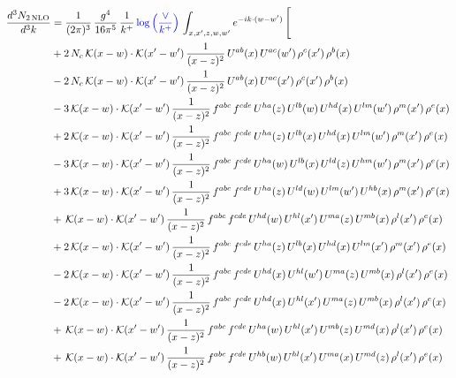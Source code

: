 \documentclass[9pt]{article}
\numberwithin{equation}{section}
\begin{document}
\begin{align}
\frac{d^{3}N_{2\,\mathrm{NLO}}}{d^{3}k} & = \frac{1}{(2\pi)^{3}}\,\frac{g^{4}}{16\pi^{5}}\,\frac{1}{k^{+}}\,{\color{blue}\log{\left(\frac{\vee}{k^{+}}\right)}}\,\int_{x,x',z,w,w'}e^{-ik\cdot (w-w')}\,\Bigg[
\notag\\ &+2\,N_{c}\,\mathcal{K}(x-w)\cdot\mathcal{K}(x'-w')\,\frac{1}{(x-z)^{2}}\,U^{ab}(x)\,U^{ac}(w')\,\rho^{c}(x')\,\rho^{b}(x)\notag\\
&-2\,N_{c}\,\mathcal{K}(x-w)\cdot\mathcal{K}(x'-w')\,\frac{1}{(x-z)^{2}}\,U^{ab}(x)\,U^{ac}(x')\,\rho^{c}(x')\,\rho^{b}(x)\notag\\
&-3\,\mathcal{K}(x-w)\cdot\mathcal{K}(x'-w')\,\frac{1}{(x-z)^{2}}\,f^{abc}\,f^{cde}\,U^{ha}(z)\,U^{lb}(w)\,U^{hd}(x)\,U^{lm}(w')\,\rho^{m}(x')\,\rho^{e}(x)\notag\\
&+2\,\mathcal{K}(x-w)\cdot\mathcal{K}(x'-w')\,\frac{1}{(x-z)^{2}}\,f^{abc}\,f^{cde}\,U^{ha}(z)\,U^{lb}(x)\,U^{hd}(x)\,U^{lm}(w')\,\rho^{m}(x')\,\rho^{e}(x)\notag\\
&-3\,\mathcal{K}(x-w)\cdot\mathcal{K}(x'-w')\,\frac{1}{(x-z)^{2}}\,f^{abc}\,f^{cde}\,U^{ha}(w)\,U^{lb}(x)\,U^{ld}(z)\,U^{hm}(w')\,\rho^{m}(x')\,\rho^{e}(x)\notag\\
&+3\,\mathcal{K}(x-w)\cdot\mathcal{K}(x'-w')\,\frac{1}{(x-z)^{2}}\,f^{abc}\,f^{cde}\,U^{ha}(z)\,U^{ld}(w)\,U^{lm}(w')\,U^{hb}(x)\,\rho^{m}(x')\,\rho^{e}(x)\notag\\
&+\,\mathcal{K}(x-w)\cdot\mathcal{K}(x'-w')\,\frac{1}{(x-z)^{2}}\,f^{abc}\,f^{cde}\,U^{hd}(w)\,U^{hl}(x')\,U^{ma}(z)\,U^{mb}(x)\,\rho^{l}(x')\,\rho^{e}(x)\notag\\
&+2\,\mathcal{K}(x-w)\cdot\mathcal{K}(x'-w')\,\frac{1}{(x-z)^{2}}\,f^{abc}\,f^{cde}\,U^{ha}(z)\,U^{lb}(x)\,U^{hd}(x)\,U^{lm}(x')\,\rho^{m}(x')\,\rho^{e}(x)\notag\\
&-2\,\mathcal{K}(x-w)\cdot\mathcal{K}(x'-w')\,\frac{1}{(x-z)^{2}}\,f^{abc}\,f^{cde}\,U^{hd}(x)\,U^{hl}(w')\,U^{ma}(z)\,U^{mb}(x)\,\rho^{l}(x')\,\rho^{e}(x)\notag\\
&-2\,\mathcal{K}(x-w)\cdot\mathcal{K}(x'-w')\,\frac{1}{(x-z)^{2}}\,f^{abc}\,f^{cde}\,U^{hd}(x)\,U^{hl}(x')\,U^{ma}(z)\,U^{mb}(x)\,\rho^{l}(x')\,\rho^{e}(x)\notag\\
&+\,\mathcal{K}(x-w)\cdot\mathcal{K}(x'-w')\,\frac{1}{(x-z)^{2}}\,f^{abc}\,f^{cde}\,U^{ha}(w)\,U^{hl}(x')\,U^{mb}(z)\,U^{md}(x)\,\rho^{l}(x')\,\rho^{e}(x)\notag\\
&+\,\mathcal{K}(x-w)\cdot\mathcal{K}(x'-w')\,\frac{1}{(x-z)^{2}}\,f^{abc}\,f^{cde}\,U^{hb}(w)\,U^{hl}(x')\,U^{ma}(x)\,U^{md}(z)\,\rho^{l}(x')\,\rho^{e}(x)\notag\\

\end{align}
\end{document}
